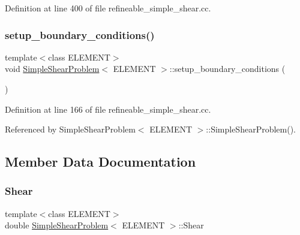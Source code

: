Definition at line 400 of file refineable\+\_\+simple\+\_\+shear.\+cc.

\mbox{\label{classSimpleShearProblem_a17449af62f8025e2b03ddb922b47016d}} 
\subsubsection{\texorpdfstring{setup\+\_\+boundary\+\_\+conditions()}{setup\_boundary\_conditions()}}
{\footnotesize\ttfamily template$<$class E\+L\+E\+M\+E\+NT$>$ \\
void \hyperlink{classSimpleShearProblem}{Simple\+Shear\+Problem}$<$ E\+L\+E\+M\+E\+NT $>$\+::setup\+\_\+boundary\+\_\+conditions (\begin{DoxyParamCaption}{ }\end{DoxyParamCaption})\hspace{0.3cm}{\ttfamily [inline]}}



Definition at line 166 of file refineable\+\_\+simple\+\_\+shear.\+cc.



Referenced by Simple\+Shear\+Problem$<$ E\+L\+E\+M\+E\+N\+T $>$\+::\+Simple\+Shear\+Problem().



\subsection{Member Data Documentation}
\mbox{\label{classSimpleShearProblem_a3844145c334e84c6ed94d803aeb1a337}} 
\subsubsection{\texorpdfstring{Shear}{Shear}}
{\footnotesize\ttfamily template$<$class E\+L\+E\+M\+E\+NT$>$ \\
double \hyperlink{classSimpleShearProblem}{Simple\+Shear\+Problem}$<$ E\+L\+E\+M\+E\+NT $>$\+::Shear\hspace{0.3cm}{\ttfamily [private]}}



